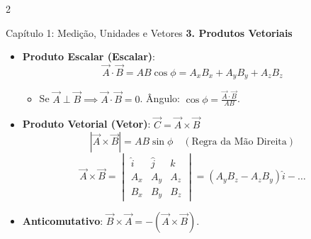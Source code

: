 \documentclass[9pt,a4paper]{article}
\begin{document}
\begin{multicols*}{2}
\begin{topicbox}{Capítulo 1: Medição, Unidades e Vetores}
\textbf{3. Produtos Vetoriais}
\begin{itemize}[leftmargin=*,itemsep=0pt]
    \item \textbf{Produto Escalar (Escalar)}:
    \begin{equation*}
        \vec{A} \cdot \vec{B} = A B \cos\phi = A_x B_x + A_y B_y + A_z B_z
    \end{equation*}
    \begin{itemize}[leftmargin=*]
        \item Se $\vec{A} \perp \vec{B} \implies \vec{A} \cdot \vec{B} = 0$. Ângulo: $\cos\phi = \frac{\vec{A} \cdot \vec{B}}{A B}$.
    \end{itemize}
    \item \textbf{Produto Vetorial (Vetor)}: $\vec{C} = \vec{A} \times \vec{B}$
    \begin{equation*}
        |\vec{A} \times \vec{B}| = A B \sin\phi \quad (\text{Regra da Mão Direita})
    \end{equation*}
    \begin{equation*}
        \vec{A} \times \vec{B} = \begin{vmatrix} \hat{i} & \hat{j} & \hat{k} \\ A_x & A_y & A_z \\ B_x & B_y & B_z \end{vmatrix} = (A_y B_z - A_z B_y)\hat{i} - \dots
    \end{equation*}
    \item \textbf{Anticomutativo}: $\vec{B} \times \vec{A} = -(\vec{A} \times \vec{B})$.
\end{itemize}

\begin{center}
\end{center}
\end{topicbox}


\end{multicols*}
\end{document}
